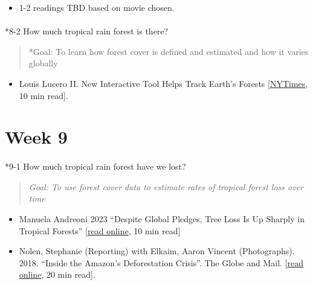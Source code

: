 \documentclass[
  10pt,
  letterpaper,
  oneside,
  open=any]{scrbook}
\makeatletter
\let\oldparagraph\paragraph
\renewcommand{\paragraph}{
    \@ifstar
      \xxxParagraphStar
      \xxxParagraphNoStar
  }
\newcommand{\xxxParagraphStar}[1]{\oldparagraph*{#1}\mbox{}}
\newcommand{\xxxParagraphNoStar}[1]{\oldparagraph{#1}\mbox{}}
\providecommand{\tightlist}{%
  \setlength{\itemsep}{0pt}\setlength{\parskip}{0pt}}
\makeatother
\begin{document}
\begin{itemize}
\tightlist
\item
  1-2 readings TBD based on movie chosen.
\end{itemize}

\paragraph*{8-2 How much tropical rain forest is
there?}\label{how-much-tropical-rain-forest-is-there}

\begin{quote}
*Goal: To learn how forest cover is defined and estimated and how it
varies globally
\end{quote}

\begin{itemize}
\tightlist
\item
  Louis Lucero II. New Interactive Tool Helps Track Earth's Forests
  {[}\href{https://www.nytimes.com/2013/11/15/science/earth/new-interactive-tool-helps-track-earths-forests.html}{NYTimes},
  10 min read{]}.
\end{itemize}

\section*{Week 9}\label{week-9}


\paragraph*{9-1 How much tropical rain forest have we
lost?}\label{how-much-tropical-rain-forest-have-we-lost}

\begin{quote}
\emph{Goal: To use forest cover data to estimate rates of tropical
forest loss over time}
\end{quote}

\begin{itemize}
\item
  Manuela Andreoni 2023 ``Despite Global Pledges, Tree Loss Is Up
  Sharply in Tropical Forests''
  {[}\href{https://www.nytimes.com/2023/06/27/climate/trees-tropical-forests-deforestation.html}{read
  online}, 10 min read{]}
\item
  Nolen, Stephanie (Reporting) with Elkaim, Aaron Vincent (Photographs).
  2018. ``Inside the Amazon's Deforestation Crisis''. The Globe and
  Mail.
  {[}\href{https://www.theglobeandmail.com/news/world/amazon-rainforest-deforestation-crisis/article37722932/}{read
  online}, 20 min read{]}.
\end{itemize}
\end{document}
